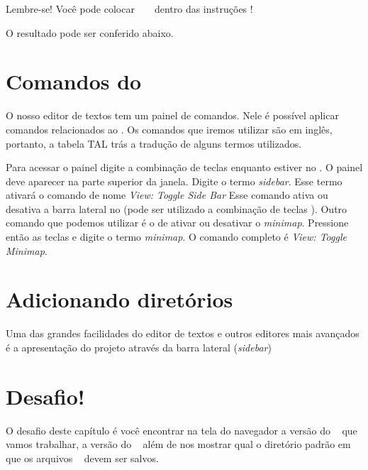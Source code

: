 

Lembre-se! Você pode colocar \tags~ \html~ dentro das instruções \php!

O resultado pode ser conferido abaixo.


\section{Comandos do \sublime}
\label{comandos-do-sublime}

O nosso editor de textos tem um painel de comandos. Nele é possível aplicar comandos
relacionados ao \sublime. Os comandos que iremos utilizar são em inglês, portanto,
a tabela TAL trás a tradução de alguns termos utilizados.

Para acessar o painel digite a combinação de teclas \ctrlshiftp enquanto estiver
no \sublime. O painel deve aparecer na parte superior da janela. Digite o termo
\textit{sidebar}. Esse termo ativará o comando de nome \textit{View: Toggle Side Bar}
Esse comando ativa ou desativa a barra lateral no \sublime (pode ser utilizado
a combinação de teclas \sublimesidebar). Outro comando que podemos utilizar é o de
ativar ou desativar o \textit{minimap}. Pressione então as teclas \ctrlshiftp
e digite o termo \textit{minimap}. O comando completo é \textit{View: Toggle Minimap}.

\section{Adicionando diretórios}
\label{adicionando-diretorios}

Uma das grandes facilidades do editor de textos \sublime e outros editores mais
avançados é a apresentação do projeto através da barra lateral (\textit{sidebar})

\section{Desafio!}
\label{desafio}
O desafio deste capítulo é você encontrar na tela do navegador a versão do \php~
que vamos trabalhar, a versão do \apache~ além de nos mostrar qual o diretório
padrão em que os arquivos \phpextensao~ devem ser salvos.